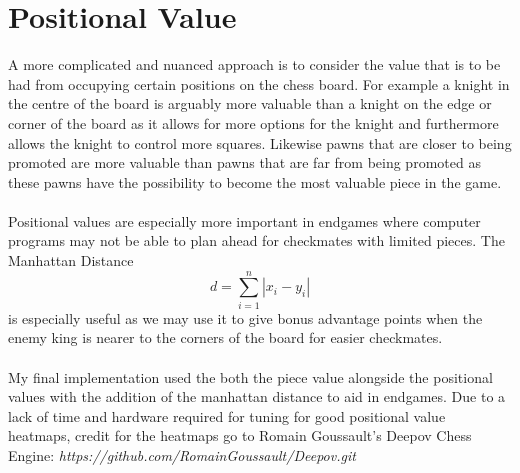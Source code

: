 \section{Positional Value}
A more complicated and nuanced approach is to consider the value that is to be had from occupying certain positions on the chess board. For example a knight in the centre of the board is arguably more valuable than a knight on the edge or corner of the board as it allows for more options for the knight and furthermore allows the knight to control more squares. Likewise pawns that are closer to being promoted are more valuable than pawns that are far from being promoted as these pawns have the possibility to become the most valuable piece in the game.\\\\
Positional values are especially more important in endgames where computer programs may not be able to plan ahead for checkmates with limited pieces. The Manhattan Distance \[d = \sum_{i = 1}^{n}|x_i - y_i|\]is especially useful as we may use it to give bonus advantage points when the enemy king is nearer to the corners of the board for easier checkmates.\\\\
My final implementation used the both the piece value alongside the positional values with the addition of the manhattan distance to aid in endgames. Due to a lack of time and hardware required for tuning for good positional value heatmaps, credit for the heatmaps go to Romain Goussault's Deepov Chess Engine: \textit{https://github.com/RomainGoussault/Deepov.git}